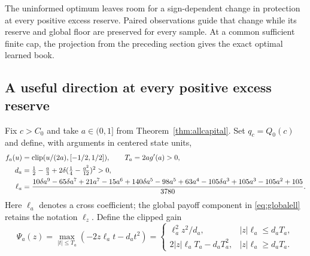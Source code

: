 \documentclass[11pt,a4paper]{amsart}
\theoremstyle{plain}
\theoremstyle{definition}
\theoremstyle{remark}
\DeclareMathOperator{\clip}{clip}
\begin{document}
The uninformed optimum leaves room for a sign-dependent change in protection at every positive excess reserve. Paired observations guide that change while its reserve and global floor are preserved for every sample. At a common sufficient finite cap, the projection from the preceding section gives the exact optimal learned book.

\subsection{A useful direction at every positive excess reserve}
Fix $c>C_0$ and take $a\in(0,1]$ from Theorem~\ref{thm:allcapital}. Set $q_c=Q_0(c)$ and define, with arguments in centered state units,
\begin{align}\label{eq:deformationcoeff}
 f_a(u)&=\clip(u/(2a),[-1/2,1/2]),\qquad T_a=2a g'(a)>0,\notag\\
 d_a&=\tfrac12-\tfrac a3+2\delta(\tfrac14-\tfrac{a^2}{12})^2>0,\notag\\
 \ell_a&=\frac{10\delta a^9-65\delta a^7+21a^7-15a^6
 +140\delta a^5-98a^5+63a^4-105\delta a^3
 +105a^3-105a^2+105}{3780}.
\end{align}
Here $\ell_a$ denotes a cross coefficient; the global payoff component in \eqref{eq:globalell} retains the notation $\ell_z$. Define the clipped gain
\begin{equation}\label{eq:psigain}
 \Psi_a(z)=\max_{|t|\le T_a}(-2z\ell_a t-d_a t^2)
 =\begin{cases}
 \ell_a^2z^2/d_a,&|z|\ell_a\le d_aT_a,\\
 2|z|\ell_aT_a-d_aT_a^2,&|z|\ell_a\ge d_aT_a.
 \end{cases}
\end{equation}
\end{document}

